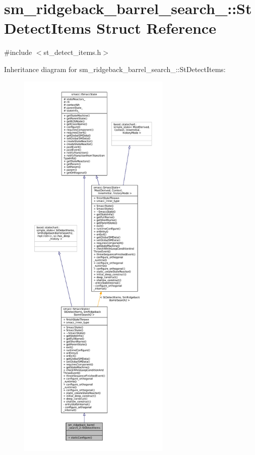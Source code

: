 \hypertarget{structsm__ridgeback__barrel__search__2_1_1StDetectItems}{}\section{sm\+\_\+ridgeback\+\_\+barrel\+\_\+search\+\_\+:\+:St\+Detect\+Items Struct Reference}
\label{structsm__ridgeback__barrel__search__2_1_1StDetectItems}


{\ttfamily \#include $<$st\+\_\+detect\+\_\+items.\+h$>$}



Inheritance diagram for sm\+\_\+ridgeback\+\_\+barrel\+\_\+search\+\_\+:\+:St\+Detect\+Items\+:
\nopagebreak
\begin{figure}[H]
\begin{center}
\leavevmode
\includegraphics[height=550pt]{structsm__ridgeback__barrel__search__2_1_1StDetectItems__inherit__graph}
\end{center}
\end{figure}


